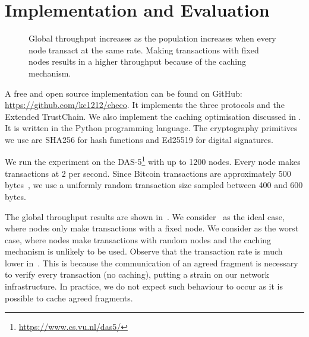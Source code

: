 \section{Implementation and Evaluation}
\label{sec:implementation}

\begin{figure*}[ht]
  \centering
  \caption{Global throughput increases as the population increases when every node transact at the same rate.
  Making transactions with fixed nodes results in a higher throughput because of the caching mechanism.}
  \label{fig:global-throughput}
\end{figure*}

A free and open source implementation can be found on GitHub: \url{https://github.com/kc1212/checo}.
It implements the three protocols and the Extended TrustChain.
We also implement the caching optimisation discussed in .
It is written in the Python programming language.
The cryptography primitives we use are SHA256 for hash functions and Ed25519 for digital signatures.

We run the experiment on the DAS-5\footnote{\url{https://www.cs.vu.nl/das5/}} with up to 1200 nodes.
Every node makes transactions at 2 per second.
Since Bitcoin transactions are approximately 500 bytes~\cite{txsize},
we use a uniformly random transaction size sampled between 400 and 600 bytes.

The global throughput results are shown in~.
We consider~ as the ideal case,
where nodes only make transactions with a fixed node.
We consider  as the worst case,
where nodes make transactions with random nodes and the caching mechanism is unlikely to be used.
Observe that the transaction rate is much lower in~.
This is because the communication of an agreed fragment is necessary to verify every transaction (no caching),
putting a strain on our network infrastructure.
In practice, we do not expect such behaviour to occur as it is possible to cache agreed fragments.

